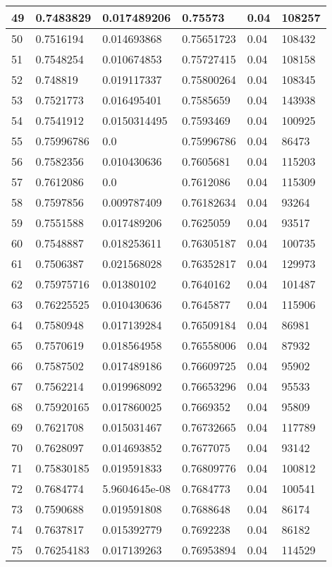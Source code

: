 \begin{longtable}{|l|l|l|l|l|l|}
49 & 0.7483829 & 0.017489206 & 0.75573 & 0.04 & 108257 \\ \hline 
50 & 0.7516194 & 0.014693868 & 0.75651723 & 0.04 & 108432 \\ \hline 
51 & 0.7548254 & 0.010674853 & 0.75727415 & 0.04 & 108158 \\ \hline 
52 & 0.748819 & 0.019117337 & 0.75800264 & 0.04 & 108345 \\ \hline 
53 & 0.7521773 & 0.016495401 & 0.7585659 & 0.04 & 143938 \\ \hline 
54 & 0.7541912 & 0.0150314495 & 0.7593469 & 0.04 & 100925 \\ \hline 
55 & 0.75996786 & 0.0 & 0.75996786 & 0.04 & 86473 \\ \hline 
56 & 0.7582356 & 0.010430636 & 0.7605681 & 0.04 & 115203 \\ \hline 
57 & 0.7612086 & 0.0 & 0.7612086 & 0.04 & 115309 \\ \hline 
58 & 0.7597856 & 0.009787409 & 0.76182634 & 0.04 & 93264 \\ \hline 
59 & 0.7551588 & 0.017489206 & 0.7625059 & 0.04 & 93517 \\ \hline 
60 & 0.7548887 & 0.018253611 & 0.76305187 & 0.04 & 100735 \\ \hline 
61 & 0.7506387 & 0.021568028 & 0.76352817 & 0.04 & 129973 \\ \hline 
62 & 0.75975716 & 0.01380102 & 0.7640162 & 0.04 & 101487 \\ \hline 
63 & 0.76225525 & 0.010430636 & 0.7645877 & 0.04 & 115906 \\ \hline 
64 & 0.7580948 & 0.017139284 & 0.76509184 & 0.04 & 86981 \\ \hline 
65 & 0.7570619 & 0.018564958 & 0.76558006 & 0.04 & 87932 \\ \hline 
66 & 0.7587502 & 0.017489186 & 0.76609725 & 0.04 & 95902 \\ \hline 
67 & 0.7562214 & 0.019968092 & 0.76653296 & 0.04 & 95533 \\ \hline 
68 & 0.75920165 & 0.017860025 & 0.7669352 & 0.04 & 95809 \\ \hline 
69 & 0.7621708 & 0.015031467 & 0.76732665 & 0.04 & 117789 \\ \hline 
70 & 0.7628097 & 0.014693852 & 0.7677075 & 0.04 & 93142 \\ \hline 
71 & 0.75830185 & 0.019591833 & 0.76809776 & 0.04 & 100812 \\ \hline 
72 & 0.7684774 & 5.9604645e-08 & 0.7684773 & 0.04 & 100541 \\ \hline 
73 & 0.7590688 & 0.019591808 & 0.7688648 & 0.04 & 86174 \\ \hline 
74 & 0.7637817 & 0.015392779 & 0.7692238 & 0.04 & 86182 \\ \hline 
75 & 0.76254183 & 0.017139263 & 0.76953894 & 0.04 & 114529 \\ \hline 
\end{longtable}